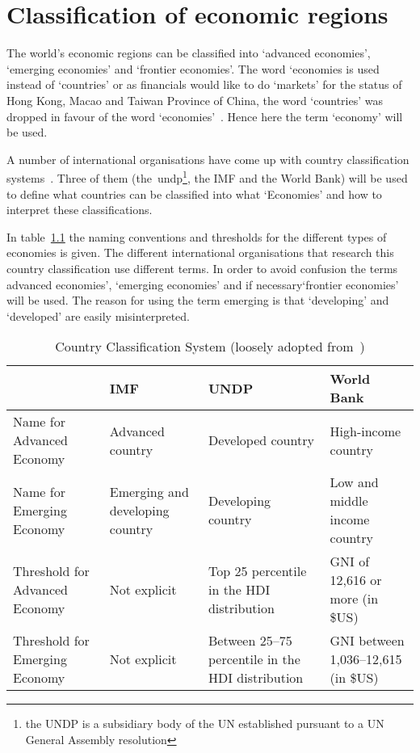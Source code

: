 \chapter{Classification of economic regions}\label{app:AEnEE}

The world's economic regions can be classified into `advanced economies', `emerging economies' and `frontier economies'.
The word `economies is used instead of `countries' or as financials would like to do `markets' for the status of Hong Kong, Macao and Taiwan Province of China, the word `countries' was dropped in favour of the word `economies'~\citep{Nielsen:2011vq}.
Hence here the term `economy' will be used.

A number of international organisations have come up  with country classification systems~\citep{Nielsen:2011vq}.
Three of them (the~\gls{undp}\footnote{the UNDP is a subsidiary body of the UN established pursuant to a UN General Assembly resolution}, the \gls{IMF} and the World Bank) will be used to define what countries can be classified into what `Economies' and how to interpret these classifications.

In table~\ref{tab:Naming} the naming conventions and thresholds for the different types of economies is given.
The different international organisations that research this country classification use different terms.
In order to avoid confusion the terms advanced economies', `emerging economies' and if necessary`frontier economies' will be used.
The reason for using the term emerging is that `developing' and `developed' are easily misinterpreted.  

\begin{table}
\centering
\caption[Country Classification System]{Country Classification System (loosely adopted from~\cite{Nielsen:2011vq})}\label{tab:Naming}
\begin{tabularx}{.99\textwidth}{p{3.25cm}XXX}
& \textbf{IMF} & \textbf{UNDP} &\textbf{World Bank}\\
 \toprule 
Name for Advanced Economy   & Advanced country & Developed country & High-income country\\ 
Name for Emerging Economy   & Emerging and developing country & Developing country & Low and middle income country\\
Threshold for Advanced Economy & Not explicit & Top 25 percentile in the HDI distribution & GNI of 12,616 or more (in \$US)\\
Threshold for Emerging Economy & Not explicit & Between 25--75 percentile in the HDI distribution & GNI between 1,036--12,615 (in \$US)\\
\bottomrule
\end{tabularx}
\end{table}

